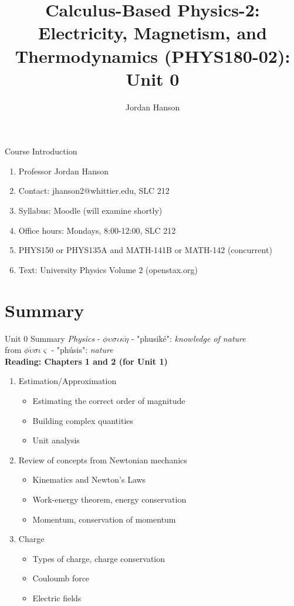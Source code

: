 \documentclass{beamer}
\title{Calculus-Based Physics-2: Electricity, Magnetism, and Thermodynamics (PHYS180-02): Unit 0}
\author{Jordan Hanson}
\institute{Whittier College Department of Physics and Astronomy}
\begin{document}
\maketitle

\begin{frame}{Course Introduction}
\begin{enumerate}
\item Professor Jordan Hanson
\item Contact: jhanson2@whittier.edu, SLC 212
\item Syllabus: Moodle (will examine shortly)
\item Office hours: Mondays, 8:00-12:00, SLC 212
\item PHYS150 or PHYS135A and MATH-141B or MATH-142 (concurrent)
\item Text: University Physics Volume 2 (openstax.org)
\end{enumerate}
\end{frame}

\section{Summary}

\begin{frame}{Unit 0 Summary}
\textit{Physics} - $\phi\upsilon\sigma\iota\kappa\acute{\eta}$ - "phusik\'e": \textit{knowledge of nature} \\
from $\phi\acute{\upsilon}\sigma\iota\varsigma$ - "ph\'usis": \textit{nature} \\
\textbf{Reading: Chapters 1 and 2 (for Unit 1)}
\begin{enumerate}
\item Estimation/Approximation
\begin{itemize}
\item \alert{Estimating} the correct order of magnitude
\item \alert{Building} complex quantities
\item \alert{Unit analysis}
\end{itemize}
\item Review of concepts from Newtonian mechanics
\begin{itemize}
\item Kinematics and \alert{Newton's Laws}
\item Work-energy theorem, energy conservation
\item Momentum, conservation of momentum
\end{itemize}
\item Charge
\begin{itemize}
\item Types of charge, charge conservation
\item Couloumb force
\item Electric fields
\end{itemize}
\end{enumerate}
\end{frame}
\end{document}

